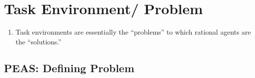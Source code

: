\section{Task Environment/ Problem \cite{ai/book/Artificial-Intelligence-A-Modern-Approach/Russell-Norvig}}


\begin{enumerate}[itemsep=0.2cm]
    \item Task environments are essentially the “problems” to which rational agents are the “solutions.”
    \hfill \cite{ai/book/Artificial-Intelligence-A-Modern-Approach/Russell-Norvig}

    
\end{enumerate}

\subsection{PEAS: Defining Problem}

